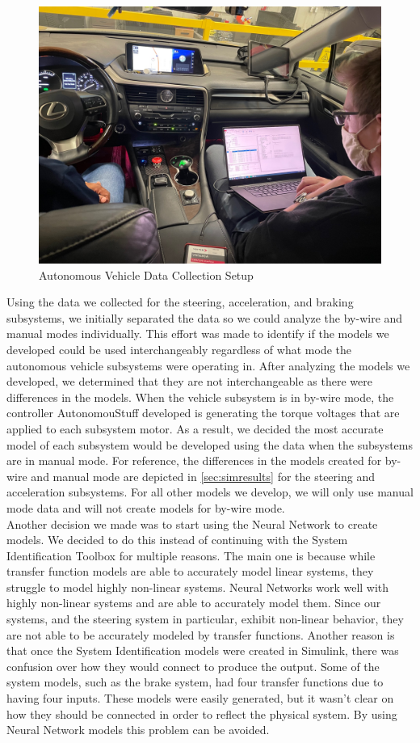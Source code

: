 \documentclass[journal,twoside,web]{ieeecolor}
\begin{document}
\begin{figure}[htbp]
	\centering
    	\includegraphics[width=.48\textwidth]{figs/img/picturesVisitToAStuff/dataColletionSetup1-20211007}
    	\caption{Autonomous Vehicle Data Collection Setup}
    	\label{fig:vehicleSetup}
\end{figure}

Using the data we collected for the steering, acceleration, and braking subsystems, we initially separated the data so we could analyze the by-wire and manual modes individually. This effort was made to identify if the models we developed could be used interchangeably regardless of what mode the autonomous vehicle subsystems were operating in. After analyzing the models we developed, we determined that they are not interchangeable as there were differences in the models. When the vehicle subsystem is in by-wire mode, the controller AutonomouStuff developed is generating the torque voltages that are applied to each subsystem motor. As a result, we decided the most accurate model of each subsystem would be developed using the data when the subsystems are in manual mode. For reference, the differences in the models created for by-wire and manual mode are depicted in \ref{sec:simresults} for the steering and acceleration subsystems. For all other models we develop, we will only use manual mode data and will not create models for by-wire mode.
\\

Another decision we made was to start using the Neural Network to create models. We decided to do this instead of continuing with the System Identification Toolbox for multiple reasons. The main one is because while transfer function models are able to accurately model linear systems, they struggle to model highly non-linear systems. Neural Networks work well with highly non-linear systems and are able to accurately model them. Since our systems, and the steering system in particular, exhibit non-linear behavior, they are not able to be accurately modeled by transfer functions. Another reason is that once the System Identification models were created in Simulink, there was confusion over how they would connect to produce the output. Some of the system models, such as the brake system, had four transfer functions due to having four inputs. These models were easily generated, but it wasn’t clear on how they should be connected in order to reflect the physical system. By using Neural Network models this problem can be avoided.
\end{document}
